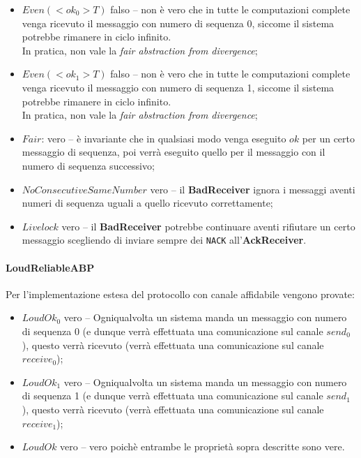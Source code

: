 \begin{itemize}
  \item $Even(<ok_0>T)$ falso -- non è vero che in tutte le computazioni
    complete venga ricevuto il messaggio con numero di sequenza 0, siccome il
    sistema potrebbe rimanere in ciclo infinito. \\
    In pratica, non vale la \emph{fair abstraction from divergence};
  \item $Even(<ok_1>T)$ falso -- non è vero che in tutte le computazioni
    complete venga ricevuto il messaggio con numero di sequenza 1, siccome il
    sistema potrebbe rimanere in ciclo infinito. \\
    In pratica, non vale la \emph{fair abstraction from divergence};
  \item $Fair$: vero -- è invariante che in qualsiasi modo venga eseguito $ok$
    per un certo messaggio di sequenza, poi verrà eseguito quello per il
    messaggio con il numero di sequenza successivo;
  \item $NoConsecutiveSameNumber$ vero -- il \textbf{BadReceiver} ignora i
    messaggi aventi numeri di sequenza uguali a quello ricevuto correttamente;
  \item $Livelock$ vero -- il \textbf{BadReceiver} potrebbe continuare aventi
    rifiutare un certo messaggio scegliendo di inviare sempre dei \texttt{NACK}
    all'\textbf{AckReceiver}.
\end{itemize}

\paragraph{LoudReliableABP} \mbox{}

Per l'implementazione estesa del protocollo con canale affidabile vengono
provate:

\begin{itemize}
  \item $LoudOk_0$ vero -- Ogniqualvolta un sistema manda un messaggio con
    numero di sequenza 0 (e dunque verrà effettuata una comunicazione sul
    canale $send_0$), questo verrà ricevuto (verrà effettuata una
    comunicazione sul canale $receive_0$);
  \item $LoudOk_1$ vero -- Ogniqualvolta un sistema manda un messaggio con
    numero di sequenza 1 (e dunque verrà effettuata una comunicazione sul
    canale $send_1$), questo verrà ricevuto (verrà effettuata una
    comunicazione sul canale $receive_1$);
  \item $LoudOk$ vero -- vero poichè entrambe le proprietà sopra descritte
    sono vere.
\end{itemize}

